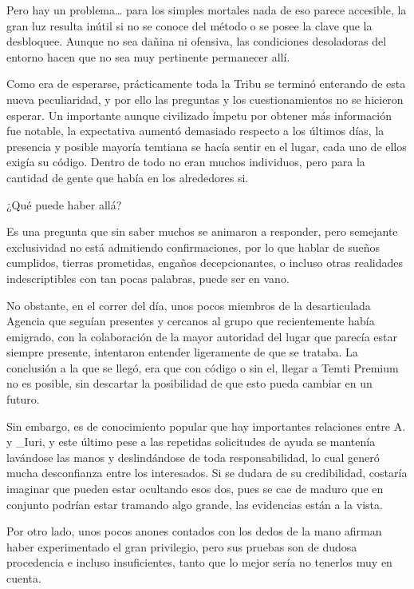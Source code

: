 \documentclass[
  spanish,
]{book}
\begin{document}
Pero hay un problema\ldots{} para los simples mortales nada de eso parece accesible, la gran luz resulta inútil si no se conoce del método o se posee la clave que la desbloquee. Aunque no sea dañina ni ofensiva, las condiciones desoladoras del entorno hacen que no sea muy pertinente permanecer allí.

Como era de esperarse, prácticamente toda la Tribu se terminó enterando de esta nueva peculiaridad, y por ello las preguntas y los cuestionamientos no se hicieron esperar. Un importante aunque civilizado ímpetu por obtener más información fue notable, la expectativa aumentó demasiado respecto a los últimos días, la presencia y posible mayoría temtiana se hacía sentir en el lugar, cada uno de ellos exigía su código. Dentro de todo no eran muchos individuos, pero para la cantidad de gente que había en los alrededores si.

¿Qué puede haber allá?

Es una pregunta que sin saber muchos se animaron a responder, pero semejante exclusividad no está admitiendo confirmaciones, por lo que hablar de sueños cumplidos, tierras prometidas, engaños decepcionantes, o incluso otras realidades indescriptibles con tan pocas palabras, puede ser en vano.

No obstante, en el correr del día, unos pocos miembros de la desarticulada Agencia que seguían presentes y cercanos al grupo que recientemente había emigrado, con la colaboración de la mayor autoridad del lugar que parecía estar siempre presente, intentaron entender ligeramente de que se trataba. La conclusión a la que se llegó, era que con código o sin el, llegar a Temti Premium no es posible, sin descartar la posibilidad de que esto pueda cambiar en un futuro.

Sin embargo, es de conocimiento popular que hay importantes relaciones entre A. y \_Iuri, y este último pese a las repetidas solicitudes de ayuda se mantenía lavándose las manos y deslindándose de toda responsabilidad, lo cual generó mucha desconfianza entre los interesados. Si se dudara de su credibilidad, costaría imaginar que pueden estar ocultando esos dos, pues se cae de maduro que en conjunto podrían estar tramando algo grande, las evidencias están a la vista.

Por otro lado, unos pocos anones contados con los dedos de la mano afirman haber experimentado el gran privilegio, pero sus pruebas son de dudosa procedencia e incluso insuficientes, tanto que lo mejor sería no tenerlos muy en cuenta.
\end{document}
